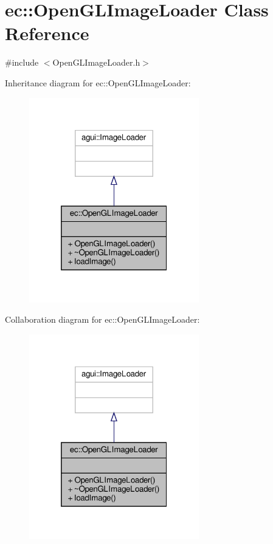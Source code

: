 \hypertarget{classec_1_1_open_g_l_image_loader}{}\section{ec\+:\+:Open\+G\+L\+Image\+Loader Class Reference}
\label{classec_1_1_open_g_l_image_loader}


{\ttfamily \#include $<$Open\+G\+L\+Image\+Loader.\+h$>$}



Inheritance diagram for ec\+:\+:Open\+G\+L\+Image\+Loader\+:\nopagebreak
\begin{figure}[H]
\begin{center}
\leavevmode
\includegraphics[width=209pt]{classec_1_1_open_g_l_image_loader__inherit__graph}
\end{center}
\end{figure}


Collaboration diagram for ec\+:\+:Open\+G\+L\+Image\+Loader\+:\nopagebreak
\begin{figure}[H]
\begin{center}
\leavevmode
\includegraphics[width=209pt]{classec_1_1_open_g_l_image_loader__coll__graph}
\end{center}
\end{figure}

